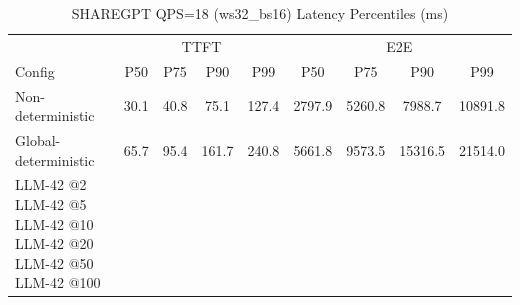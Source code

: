 \begin{table}[htbp]
\centering
\caption{SHAREGPT QPS=18 (ws32_bs16) Latency Percentiles (ms)}
\label{tab:sharegpt_qps18_ws32_bs16}
\begin{tabular}{l|cccc|cccc}
\toprule
& \multicolumn{4}{c|}{TTFT} & \multicolumn{4}{c}{E2E} \\
Config & P50 & P75 & P90 & P99 & P50 & P75 & P90 & P99 \\
\midrule
Non-deterministic & 30.1 & 40.8 & 75.1 & 127.4 & 2797.9 & 5260.8 & 7988.7 & 10891.8 \\
Global-deterministic & 65.7 & 95.4 & 161.7 & 240.8 & 5661.8 & 9573.5 & 15316.5 & 21514.0 \\
LLM-42 @2%
LLM-42 @5%
LLM-42 @10%
LLM-42 @20%
LLM-42 @50%
LLM-42 @100%
\bottomrule
\end{tabular}
\end{table}
